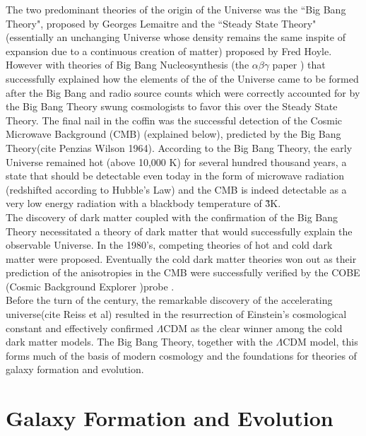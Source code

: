 The two predominant theories of the origin of the Universe was the ``Big Bang Theory", proposed by Georges Lemaitre and the ``Steady State Theory"(essentially an unchanging Universe whose density remains the same inspite of expansion due to a continuous creation of matter) proposed by Fred Hoyle. However with theories of Big Bang Nucleosynthesis (the $\alpha\beta\gamma$ paper \citep{alpher_origin_1948}) that successfully explained how the elements of the of the Universe came to be formed after the Big Bang and radio source counts which were correctly accounted for by the Big Bang Theory swung cosmologists to favor this over the Steady State Theory. The final nail in the coffin was the successful detection of the Cosmic Microwave Background (CMB) (explained below), predicted by the Big Bang Theory(cite Penzias Wilson 1964). According to the Big Bang Theory, the early Universe remained hot (above 10,000 K) for several hundred thousand years, a state that should be detectable even today in the form of microwave radiation (redshifted according to Hubble's Law) and the CMB is indeed detectable as a very low energy radiation with a blackbody temperature of \~ 3K.\\

The discovery of dark matter coupled with the confirmation of the Big Bang Theory necessitated a theory of dark matter that would successfully explain the observable Universe. In the 1980's, competing theories of hot and cold dark matter \citep{1985ApJ...292..371D} were proposed. Eventually the cold dark matter theories won out as their prediction of the anisotropies in the CMB \citep{peebles_large-scale_1982} were successfully verified by the COBE (Cosmic Background Explorer )probe \citep{riess_observational_1998}.\\

Before the turn of the century, the remarkable discovery of the accelerating universe(cite Reiss et al) resulted in the resurrection of Einstein's cosmological constant and effectively confirmed $\Lambda$CDM as the clear winner among the cold dark matter models. The Big Bang Theory, together with the $\Lambda$CDM model, this forms much of the basis of modern cosmology and the foundations for theories of galaxy formation and evolution.\\

\section{Galaxy Formation and Evolution}

